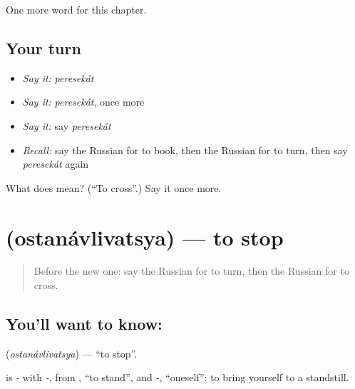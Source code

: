 \begin{grammarlens}[title={What you've built}]
One more word for this chapter.
\end{grammarlens}

\subsection*{Your turn}
\begin{itemize}
\raggedright
  \item \emph{Say it:} \emph{peresekát}
  \item \emph{Say it:} \emph{peresekát}, once more
  \item \emph{Say it:} say \emph{peresekát}
  \item \emph{Recall:} say the Russian for to book, then the Russian for to turn, then say \emph{peresekát} again
\end{itemize}

\begin{tcolorbox}[breakable,colback=teal!4,colframe=teal!35!black,title={Before you move on}]
What does  mean? (\textquotedblleft{}To cross\textquotedblright{}.) Say it once more.
\end{tcolorbox}
\section[\texorpdfstring{\ru{останавливаться} (ostanávlivatsya)}{останавливаться (ostanávlivatsya)}]{ (ostanávlivatsya) — to stop}

\label{lesson:RU-C146-ostanavlivatsya}



\begin{quote}
Before the new one: say the Russian for to turn, then the Russian for to cross.
\end{quote}

\subsection*{You'll want to know: }
\textbf{} (\emph{ostanávlivatsya}) — \textquotedblleft{}to stop\textquotedblright{}.

\begin{cousinweb}
\textbf{} is \emph{-} with \emph{-}, from \emph{}, \textquotedblleft{}to stand\textquotedblright{}, and \emph{-}, \textquotedblleft{}oneself\textquotedblright{}: to bring yourself to a standstill.
\end{cousinweb}

